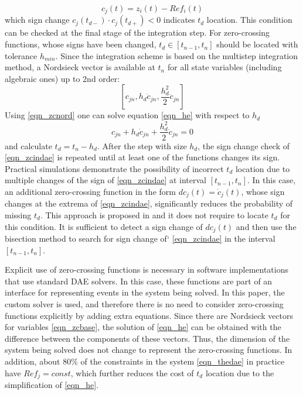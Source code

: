 \documentclass[lettersize,journal]{IEEEtran}
\begin{document}
\begin{equation}
	\label{eqn_zcindae}
	c_j(t)=z_i(t)-Ref_i(t)
\end{equation}
\noindent which sign change \(c_j(t_{d-}) \cdot c_j(t_{d+}) < 0 \) indicates \(t_d\) location. This condition can be checked at the final stage of the integration step.
For zero-crossing functions, whose signs have been changed, \(t_d \in [t_{n-1}, t_n]\) should be located with tolerance \(h_{min}\). Since the integration scheme is based on the multistep integration method, a Nordsieck vector is available at \(t_n\) for all state variables (including algebraic ones) up to 2nd order:
\begin{equation}
	\label{eqn_zcnord}
	\left[ c_{jn}, h_d\dot{c}_{jn}, \frac{h_d^2}{2}\ddot{c}_{jn}\right]
\end{equation}
Using \eqref{eqn_zcnord} one can solve equation \eqref{eqn_he} with respect to \(h_d\)
\begin{equation}
	\label{eqn_he}
	c_{jn}+h_d\dot{c}_{jn}+\frac{h_d^2}{2}\ddot{c}_{jn} = 0
\end{equation}
\noindent and calculate \(t_d = t_n - h_d\). After the step with size \(h_d\), the sign change check of \eqref{eqn_zcindae}  is repeated until at least one of the functions changes its sign.
Practical simulations demonstrate the possibility of incorrect \(t_d\) location due to multiple changes of the sign of \eqref{eqn_zcindae} at interval \(\left[t_{n-1},t_n\right]\). In this case, an additional zero-crossing function in the form \(dc_j(t)=\dot{c}_j(t)\), whose sign changes at the extrema of \eqref{eqn_zcindae}, significantly reduces the probability of missing \(t_d\). This approach is proposed in \cite{cellier06} and it does not require to locate \(t_d\) for this condition. It is sufficient to detect a sign change of \(dc_j(t)\) and then use the bisection method to search for sign change of` \eqref{eqn_zcindae} in the interval \(\left[t_{n-1},t_n\right]\).

Explicit use of zero-crossing functions is necessary in software implementations that use standard DAE solvers. In this case, these functions are part of an interface for representing events in the system being solved. In this paper, the custom solver is used, and therefore there is no need to consider zero-crossing functions explicitly by adding extra equations. Since there are Nordsieck vectors for variables \eqref{eqn_zcbase}, the solution of \eqref{eqn_he} can be obtained with the difference between the components of these vectors. Thus, the dimension of the system being solved does not change to represent the zero-crossing functions. In addition, about 80\% of the constraints in the system \eqref{eqn_thedae} in practice have \(Ref_j=const\), which further reduces the cost of \(t_d\) location due to the simplification of \eqref{eqn_he}.
\end{document}
